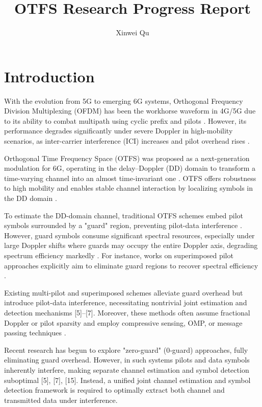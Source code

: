 \documentclass{article}
\title{OTFS Research Progress Report}
\author{Xinwei Qu}
\date{}
\begin{document}
\maketitle
\section{Introduction}
With the evolution from 5G to emerging 6G systems, Orthogonal Frequency Division Multiplexing (OFDM) has been the workhorse waveform in 4G/5G due to its ability to combat multipath using cyclic prefix and pilots \cite{10334727, 8647394}. However, its performance degrades significantly under severe Doppler in high-mobility scenarios, as inter-carrier interference (ICI) increases and pilot overhead rises \cite{8647394}.

Orthogonal Time Frequency Space (OTFS) was proposed as a next-generation modulation for 6G, operating in the delay–Doppler (DD) domain to transform a time-varying channel into an almost time-invariant one \cite{10334727, 8671740}. OTFS offers robustness to high mobility and enables stable channel interaction by localizing symbols in the DD domain \cite{10334727}.

To estimate the DD-domain channel, traditional OTFS schemes embed pilot symbols surrounded by a "guard" region, preventing pilot-data interference \cite{9539066}. However, guard symbols consume significant spectral resources, especially under large Doppler shifts where guards may occupy the entire Doppler axis, degrading spectrum efficiency markedly \cite{9536449}. For instance, works on superimposed pilot approaches explicitly aim to eliminate guard regions to recover spectral efficiency \cite{9536449}.

Existing multi-pilot and superimposed schemes alleviate guard overhead but introduce pilot-data interference, necessitating nontrivial joint estimation and detection mechanisms [5]–[7]. Moreover, these methods often assume fractional Doppler or pilot sparsity and employ compressive sensing, OMP, or message passing techniques \cite{9536449}.

Recent research has begun to explore "zero-guard" (0‑guard) approaches, fully eliminating guard overhead. However, in such systems pilots and data symbols inherently interfere, making separate channel estimation and symbol detection suboptimal [5], [7], [15]. Instead, a unified joint channel estimation and symbol detection framework is required to optimally extract both channel and transmitted data under interference.
\end{document}
